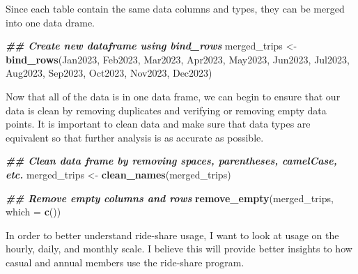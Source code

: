 \documentclass[
]{article}
\newenvironment{Shaded}{\begin{snugshade}}{\end{snugshade}}
\newcommand{\AttributeTok}[1]{\textcolor[rgb]{0.13,0.29,0.53}{#1}}
\newcommand{\ConstantTok}[1]{\textcolor[rgb]{0.56,0.35,0.01}{#1}}
\newcommand{\DocumentationTok}[1]{\textcolor[rgb]{0.56,0.35,0.01}{\textbf{\textit{#1}}}}
\newcommand{\FunctionTok}[1]{\textcolor[rgb]{0.13,0.29,0.53}{\textbf{#1}}}
\newcommand{\NormalTok}[1]{#1}
\newcommand{\OtherTok}[1]{\textcolor[rgb]{0.56,0.35,0.01}{#1}}
\newcommand{\SpecialCharTok}[1]{\textcolor[rgb]{0.81,0.36,0.00}{\textbf{#1}}}
\newcommand{\StringTok}[1]{\textcolor[rgb]{0.31,0.60,0.02}{#1}}
\begin{document}
Since each table contain the same data columns and types, they can be
merged into one data drame.

\begin{Shaded}
\begin{Highlighting}[]
\DocumentationTok{\#\# Create new dataframe using bind\_rows}
\NormalTok{merged\_trips }\OtherTok{\textless{}{-}} \FunctionTok{bind\_rows}\NormalTok{(Jan2023, Feb2023, Mar2023, Apr2023, May2023, Jun2023, Jul2023, Aug2023, Sep2023, Oct2023, Nov2023, Dec2023)}
\end{Highlighting}
\end{Shaded}

Now that all of the data is in one data frame, we can begin to ensure
that our data is clean by removing duplicates and verifying or removing
empty data points. It is important to clean data and make sure that data
types are equivalent so that further analysis is as accurate as
possible.

\begin{Shaded}
\begin{Highlighting}[]
\DocumentationTok{\#\# Clean data frame by removing spaces, parentheses, camelCase, etc.}
\NormalTok{merged\_trips }\OtherTok{\textless{}{-}} \FunctionTok{clean\_names}\NormalTok{(merged\_trips)}

\DocumentationTok{\#\# Remove empty columns and rows}
\FunctionTok{remove\_empty}\NormalTok{(merged\_trips, }\AttributeTok{which =} \FunctionTok{c}\NormalTok{())}
\end{Highlighting}
\end{Shaded}

In order to better understand ride-share usage, I want to look at usage
on the hourly, daily, and monthly scale. I believe this will provide
better insights to how casual and annual members use the ride-share
program.

\begin{Shaded}
\end{Shaded}
\end{document}
